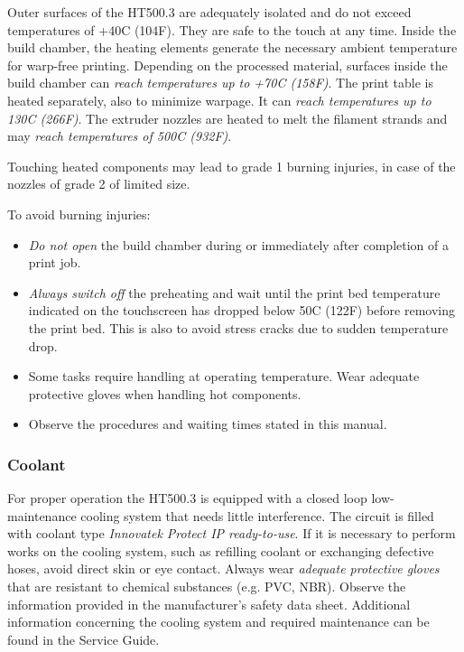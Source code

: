 Outer surfaces of the HT500.3 are adequately isolated and do not exceed temperatures of +40\degree C (104\degree F). They are safe to the touch at any time.
Inside the build chamber, the heating elements generate the necessary ambient temperature for warp-free printing.
Depending on the processed material, surfaces inside the build chamber can \emph{reach temperatures up to +70\degree C (158\degree F)}.
The print table is heated separately, also to minimize warpage. It can \emph{reach temperatures up to 130\degree C (266\degree F)}.
The extruder nozzles are heated to melt the filament strands and may \emph{reach temperatures of 500\degree C (932\degree F)}.

Touching heated components may lead to grade 1 burning injuries, in case of the nozzles of grade 2 of limited size.

To avoid burning injuries:

\begin{itemize}
  \item \emph{Do not open} the build chamber during or immediately after completion of a print job.
  \item \emph{Always switch off} the preheating and wait until the print bed temperature indicated on the touchscreen 
        has dropped below 50\degree C (122\degree F) 
        before removing the print bed. This is also to avoid stress cracks due to sudden temperature drop.
  \item Some tasks require handling at operating temperature. Wear adequate protective gloves when handling 
        hot components.
  \item Observe the procedures and waiting times stated in this manual.
\end{itemize}


\subsubsection{Coolant}

For proper operation the HT500.3 is equipped with a closed loop low-maintenance cooling system that needs little interference. The circuit is filled with coolant type \emph{Innovatek Protect IP ready-to-use}.
If it is necessary to perform works on the cooling system, such as refilling coolant or exchanging defective hoses, avoid direct skin or eye contact. Always wear \emph{adequate protective gloves} that are resistant to chemical substances (e.g. PVC, NBR).
Observe the information provided in the manufacturer's safety data sheet.
Additional information concerning the cooling system and required maintenance can be found in the Service Guide.



